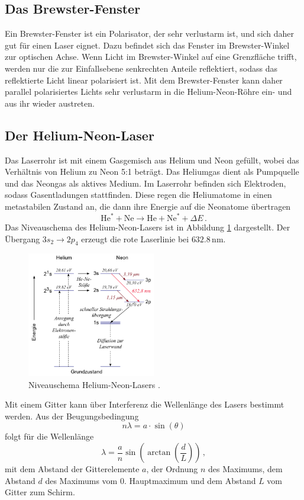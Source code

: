 \subsection*{Das Brewster-Fenster}
Ein Brewster-Fenster ist ein Polarisator, der sehr verlustarm ist, und sich daher gut für einen Laser eignet.
Dazu befindet sich das Fenster im Brewster-Winkel zur optischen Achse. Wenn Licht im Brewster-Winkel auf eine Grenzfläche
trifft, werden nur die zur Einfallsebene senkrechten Anteile reflektiert, sodass das reflektierte Licht linear polarisiert 
ist. Mit dem Brewster-Fenster kann daher parallel polarisiertes Lichts sehr verlustarm in die Helium-Neon-Röhre ein- und aus ihr wieder austreten.

\subsection*{Der Helium-Neon-Laser}
Das Laserrohr ist mit einem Gasgemisch aus Helium und Neon gefüllt, wobei das Verhältnis von Helium zu Neon 5:1 beträgt.
Das Heliumgas dient als Pumpquelle und das Neongas als aktives Medium. Im Laserrohr befinden sich Elektroden, sodass 
Gasentladungen stattfinden. Diese regen die Heliumatome in einen metastabilen Zustand an, die dann ihre Energie auf 
die Neonatome übertragen
\begin{equation*}
    \text{He}^{*} + \text{Ne} \rightarrow \text{He} + \text{Ne}^{*} + \Delta E \, .
\end{equation*}
Das Niveauschema des Helium-Neon-Lasers ist in Abbildung \ref{fig:tfig8} dargestellt.
Der Übergang $3s_2 \rightarrow 2p_4$ erzeugt die rote Laserlinie bei $632.8 \, \si{\nano\meter}$.
\FloatBarrier
    \begin{figure}[h]
    \centering
    \includegraphics[width=0.5\textwidth]{henelaser.png}
    \caption{Niveauschema Helium-Neon-Lasers \cite{quelle01}.}
    \label{fig:tfig8}
    \end{figure}
\FloatBarrier
\noindent
Mit einem Gitter kann über Interferenz die Wellenlänge des Lasers bestimmt werden. Aus der Beugungsbedingung 
\begin{equation*}
    n \lambda = a \cdot \sin \left(\theta \right)
\end{equation*}
folgt für die Wellenlänge
\begin{equation}
    \label{eq:Wellenlänge}
    \lambda = \frac{a}{n}  \sin \left(\arctan \left(\frac{d}{L}\right)\right)     \, ,
\end{equation}
mit dem Abstand der Gitterelemente $a$, der Ordnung $n$ des Maximums, dem Abstand $d$ des Maximums vom 0. Hauptmaximum
und dem Abstand $L$ vom Gitter zum Schirm.

